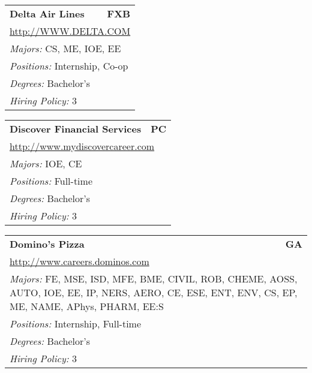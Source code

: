 \documentclass[twoside]{article}
\begin{document}
\begin{center}
\begin{multicols}{3}
\begin{FlushLeft}
\begin{minipage}{.9\columnwidth}
\end{minipage}
 
\begin{minipage}{.9\columnwidth}\begin{tabularx}{.95\columnwidth}{Xr}
                 {\Large\bf Delta Air Lines} & {\Large\bf FXB}\\
    \multicolumn{2}{p{.95\columnwidth}}{\url{http://WWW.DELTA.COM}}\\
    \multicolumn{2}{p{.95\columnwidth}}{\emph{Majors:} CS, ME, IOE, EE}\\
    \multicolumn{2}{p{.95\columnwidth}}{\emph{Positions:} Internship, Co-op}\\
    \multicolumn{2}{p{.95\columnwidth}}{\emph{Degrees:} Bachelor's}\\
    \multicolumn{2}{p{.95\columnwidth}}{\emph{Hiring Policy:} 3}\\
    \end{tabularx}
    
\end{minipage}
 
\begin{minipage}{.9\columnwidth}\begin{tabularx}{.95\columnwidth}{Xr}
                 {\Large\bf Discover Financial Services} & {\Large\bf PC}\\
    \multicolumn{2}{p{.95\columnwidth}}{\url{http://www.mydiscovercareer.com}}\\
    \multicolumn{2}{p{.95\columnwidth}}{\emph{Majors:} IOE, CE}\\
    \multicolumn{2}{p{.95\columnwidth}}{\emph{Positions:} Full-time}\\
    \multicolumn{2}{p{.95\columnwidth}}{\emph{Degrees:} Bachelor's}\\
    \multicolumn{2}{p{.95\columnwidth}}{\emph{Hiring Policy:} 3}\\
    \end{tabularx}
    
\end{minipage}
 
\begin{minipage}{.9\columnwidth}\begin{tabularx}{.95\columnwidth}{Xr}
                 {\Large\bf Domino's Pizza} & {\Large\bf GA}\\
    \multicolumn{2}{p{.95\columnwidth}}{\url{http://www.careers.dominos.com}}\\
    \multicolumn{2}{p{.95\columnwidth}}{\emph{Majors:} FE, MSE, ISD, MFE, BME, CIVIL, ROB, CHEME, AOSS, AUTO, IOE, EE, IP, NERS, AERO, CE, ESE, ENT, ENV, CS, EP, ME, NAME, APhys, PHARM, EE:S}\\
    \multicolumn{2}{p{.95\columnwidth}}{\emph{Positions:} Internship, Full-time}\\
    \multicolumn{2}{p{.95\columnwidth}}{\emph{Degrees:} Bachelor's}\\
    \multicolumn{2}{p{.95\columnwidth}}{\emph{Hiring Policy:} 3}\\
    \end{tabularx}
    

\end{minipage}
\end{FlushLeft}
\end{multicols}
\end{center}
\end{document}
